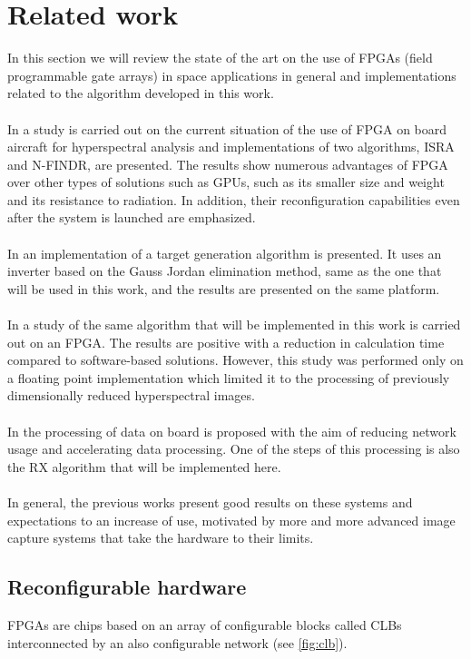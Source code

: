 \section{Related work}
In this section we will review the state of the art on the use of FPGAs (field programmable gate arrays) in space applications in general and implementations related to the algorithm developed in this work.
\\
\\
In \cite{lopez_promise_2013} a study is carried out on the current situation of the use of FPGA on board aircraft for hyperspectral analysis and implementations of two algorithms, ISRA and N-FINDR, are presented. The results show numerous advantages of FPGA over other types of solutions such as GPUs, such as its smaller size and weight and its resistance to radiation. In addition, their reconfiguration capabilities even after the system is launched are emphasized.
\\
\\
In \cite{gonzalez_fpga_2016} an implementation of a target generation algorithm is presented. It uses an inverter based on the Gauss Jordan elimination method, same as the one that will be used in this work, and the results are presented on the same platform.
\\
\\
In \cite{colome_garcia_implementacion_2013} a study of the same algorithm that will be implemented in this work is carried out on an FPGA. The results are positive with a reduction in calculation time compared to software-based solutions. However, this study was performed only on a floating point implementation which limited it to the processing of previously dimensionally reduced hyperspectral images.
\\
\\
In \cite{theiler_onboard_2018} the processing of data on board is proposed with the aim of reducing network usage and accelerating data processing. One of the steps of this processing is also the RX algorithm that will be implemented here.
\\
\\
In general, the previous works present good results on these systems and expectations to an increase of use, motivated by more and more advanced image capture systems that take the hardware to their limits.
\pagebreak
\subsection{Reconfigurable hardware}
FPGAs are chips based on an array of configurable blocks called CLBs interconnected by an also configurable network (see \autoref{fig:clb}).

